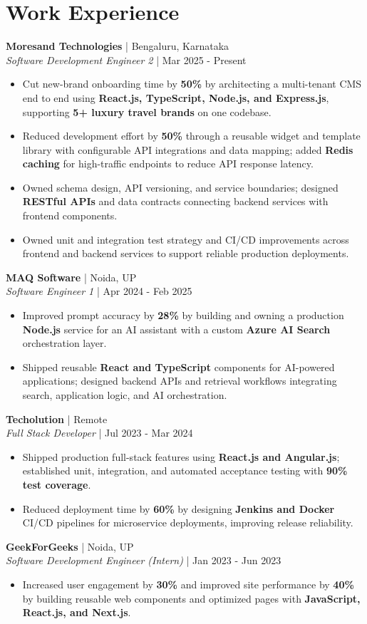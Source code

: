 \documentclass[a4paper,10pt]{article}
\newcommand{\role}[4]{\textbf{#1} | #2\\\textit{#3} | #4\par}
\begin{document}
\section{Work Experience}
\role{Moresand Technologies}{Bengaluru, Karnataka}{Software Development Engineer 2}{Mar 2025 - Present}
\begin{itemize}
\item Cut new-brand onboarding time by \textbf{50\%} by architecting a multi-tenant CMS end to end using \textbf{React.js, TypeScript, Node.js, and Express.js}, supporting \textbf{5+ luxury travel brands} on one codebase.
\item Reduced development effort by \textbf{50\%} through a reusable widget and template library with configurable API integrations and data mapping; added \textbf{Redis caching} for high-traffic endpoints to reduce API response latency.
\item Owned schema design, API versioning, and service boundaries; designed \textbf{RESTful APIs} and data contracts connecting backend services with frontend components.
\item Owned unit and integration test strategy and CI/CD improvements across frontend and backend services to support reliable production deployments.
\end{itemize}
\role{MAQ Software}{Noida, UP}{Software Engineer 1}{Apr 2024 - Feb 2025}
\begin{itemize}
\item Improved prompt accuracy by \textbf{28\%} by building and owning a production \textbf{Node.js} service for an AI assistant with a custom \textbf{Azure AI Search} orchestration layer.
\item Shipped reusable \textbf{React and TypeScript} components for AI-powered applications; designed backend APIs and retrieval workflows integrating search, application logic, and AI orchestration.
\end{itemize}
\role{Techolution}{Remote}{Full Stack Developer}{Jul 2023 - Mar 2024}
\begin{itemize}
\item Shipped production full-stack features using \textbf{React.js and Angular.js}; established unit, integration, and automated acceptance testing with \textbf{90\% test coverage}.
\item Reduced deployment time by \textbf{60\%} by designing \textbf{Jenkins and Docker} CI/CD pipelines for microservice deployments, improving release reliability.
\end{itemize}
\role{GeekForGeeks}{Noida, UP}{Software Development Engineer (Intern)}{Jan 2023 - Jun 2023}
\begin{itemize}
\item Increased user engagement by \textbf{30\%} and improved site performance by \textbf{40\%} by building reusable web components and optimized pages with \textbf{JavaScript, React.js, and Next.js}.
\end{itemize}
\end{document}

